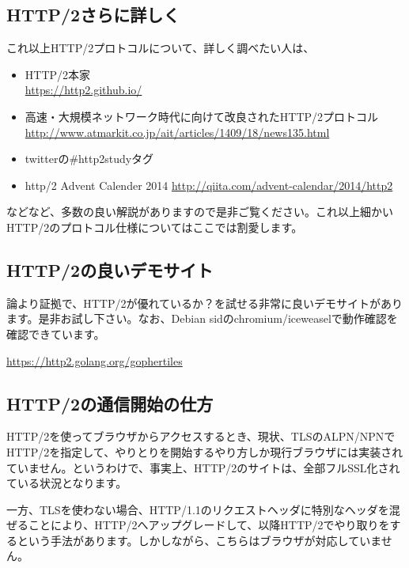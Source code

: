\documentclass[mingoth,a4paper]{jsarticle}
\begin{document}
\subsection{HTTP/2さらに詳しく}

  これ以上HTTP/2プロトコルについて、詳しく調べたい人は、

 \begin{itemize}
  \item HTTP/2本家\\
    \url{https://http2.github.io/}
  \item 高速・大規模ネットワーク時代に向けて改良されたHTTP/2プロトコル
    \url{http://www.atmarkit.co.jp/ait/articles/1409/18/news135.html}
  \item twitterの\#http2studyタグ
  \item http/2 Advent Calender 2014
    \url{http://qiita.com/advent-calendar/2014/http2}
\end{itemize}

 などなど、多数の良い解説がありますので是非ご覧ください。これ以上細かいHTTP/2のプロトコル仕様についてはここでは割愛します。

 \subsection{HTTP/2の良いデモサイト}

 論より証拠で、HTTP/2が優れているか？を試せる非常に良いデモサイトがあります。是非お試し下さい。なお、Debian sidのchromium/iceweaselで動作確認を確認できています。
 \\
\begin{center} 
 \url{https://http2.golang.org/gophertiles}
\end{center}

\subsection{HTTP/2の通信開始の仕方}

 HTTP/2を使ってブラウザからアクセスするとき、現状、TLSのALPN/NPNでHTTP/2を指定して、やりとりを開始するやり方しか現行ブラウザには実装されていません。というわけで、事実上、HTTP/2のサイトは、全部フルSSL化されている状況となります\cite{ref:wikipedia-http-2}。

 一方、TLSを使わない場合、HTTP/1.1のリクエストヘッダに特別なヘッダを混ぜることにより、HTTP/2へアップグレードして、以降HTTP/2でやり取りをするという手法があります。しかしながら、こちらはブラウザが対応していません\cite{ref:http-2-protocol-upgrade-primer}。
\end{document}

